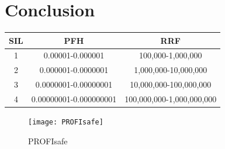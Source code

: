\documentclass[11pt]{report}
\begin{document}
\chapter{Conclusion}



\begin{center}
\begin{tabular}{|c||c|c|}
\hline 
SIL & 	PFH &		RRF\\ \hline
1 &	0.00001-0.000001 &	100,000-1,000,000\\
2 &	0.000001-0.0000001 &		1,000,000-10,000,000\\
3 &	0.0000001-0.00000001 		& 10,000,000-100,000,000\\
4 &	0.00000001-0.000000001 &	100,000,000-1,000,000,000\\
\hline
\end{tabular}
\end{center}


\begin{center}
\begin{figure}[htbp]
\texttt{[image: PROFIsafe]}
\caption{PROFIsafe}
\label{Abb.:1}
\end{figure}
\end{center}
\end{document}

